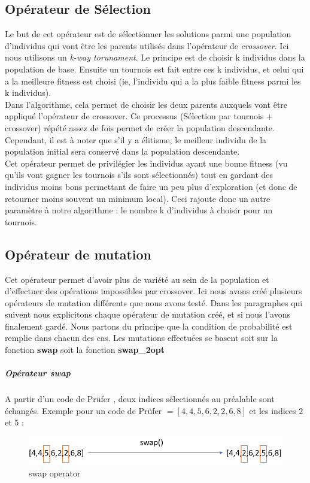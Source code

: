 \documentclass{article} %
\begin{document}
\subsection{Opérateur de Sélection}
Le but de cet opérateur est de sélectionner les solutions parmi une population d'individus qui vont être les parents utilisés dans l'opérateur de \textit{crossover}. Ici nous utilisons un \textit{k-way torunament}. Le principe est de choisir k individus dans la population de base. Ensuite un tournois est fait entre ces k individus, et celui qui a la meilleure fitness est choisi (ie, l'individu qui a la plus faible fitness parmi les k individus).\\
Dans l'algorithme, cela permet de choisir les deux parents auxquels vont être appliqué l'opérateur de crossover. Ce processus (Sélection par tournois + crossover) répété assez de fois permet de créer la population descendante. Cependant, il est à noter que s'il y a élitisme, le meilleur individu de la population initial sera conservé dans la population descendante.\\
Cet opérateur permet de privilégier les individus ayant une bonne fitness (vu qu'ils vont gagner les tournois s'ils sont sélectionnés) tout en gardant des individus moins bons permettant de faire un peu plus d'exploration (et donc de retourner moins souvent un minimum local). Ceci rajoute donc un autre paramètre à notre algorithme : le nombre k d'individus à choisir pour un tournois.\\


\subsection{Opérateur de mutation}
Cet opérateur permet d'avoir plus de variété au sein de la population et d'effectuer des opérations impossibles par crossover. Ici nous avons créé plusieurs opérateurs de mutation différents que nous avons testé.
Dans les paragraphes qui suivent nous explicitons chaque opérateur de mutation créé, et si nous l'avons finalement gardé. Nous partons du principe que la condition de probabilité est remplie dans chacun des cas. Les mutations effectuées se basent soit sur la fonction \textbf{swap} soit la fonction \textbf{swap\_2opt}

\subparagraph{Opérateur swap\\}
A partir d'un code de Prüfer , deux indices sélectionnés au préalable sont échangés. Exemple pour un code de Prüfer $ = [4,4,5,6,2,2,6,8]$ et les indices $2$ et $5$ :
\begin{figure}[!h]
	\centering
	\includegraphics[keepaspectratio = true,scale=0.8]{mutate.png}
	\caption{swap operator}
\end{figure}
\end{document}
